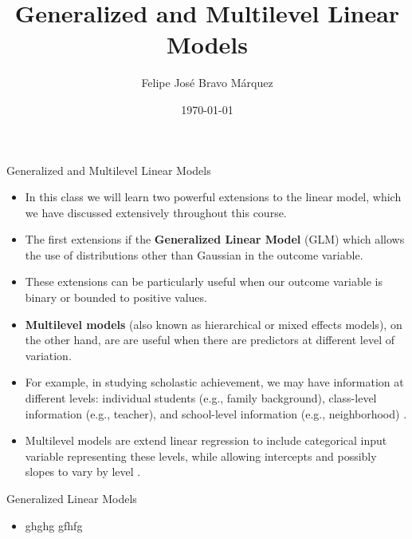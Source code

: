 \documentclass[handout]{beamer}
\title{Generalized and Multilevel Linear Models}
\author[Felipe Bravo Márquez]{\footnotesize
 \textcolor[rgb]{0.00,0.00,1.00}{Felipe José Bravo Márquez}}
\date{ \today }
\begin{document}
\begin{frame}
\titlepage


\end{frame}




\begin{frame}{Generalized and Multilevel Linear Models}
\scriptsize{
\begin{itemize}
\item In this class we will learn two powerful extensions to the linear model, which we have discussed extensively throughout this course.

\item The first extensions if the \textbf{Generalized Linear Model} (GLM) which allows the use of distributions other than Gaussian in the outcome variable.

\item These extensions can be particularly useful when our outcome variable  is binary or bounded to positive values.

\item \textbf{Multilevel models} (also known as hierarchical or mixed effects models), on the other hand, are are useful when there are predictors at different level of variation.

\item For example, in studying scholastic achievement, we may have information at different levels:  individual students  (e.g., family background), class-level information (e.g., teacher), and school-level information (e.g., neighborhood) \cite{gelman2013bayesian}.


\item Multilevel models are extend linear regression to include categorical input variable representing these levels, while allowing intercepts and possibly slopes to vary by level \cite{gelman2006data}.



\end{itemize}



}

\end{frame}


\begin{frame}{Generalized Linear Models}
\scriptsize{
\begin{itemize}
\item ghghg  gfhfg\cite{mcelreath2020statistical}
 
\end{itemize}



} 

\end{frame}
\end{document}
